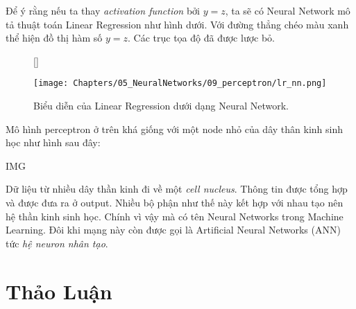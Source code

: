 Để ý rằng nếu ta thay \textit{activation function} bởi $y = z$, ta sẽ có Neural Network mô tả thuật toán Linear Regression như hình dưới. Với đường thẳng chéo màu xanh thể hiện đồ thị hàm số $y = z$. Các trục tọa độ đã được lược bỏ. 
 

\begin{figure}[t]
    [\FBwidth]
    {\caption{ 
    Biểu diễn của Linear Regression dưới dạng Neural Network.
    }
    \label{fig:9_6}}
    { %
    \texttt{[image: Chapters/05\_NeuralNetworks/09\_perceptron/lr\_nn.png]}
    }
\end{figure}

 
Mô hình perceptron ở trên khá giống với một node nhỏ của dây thân kinh sinh học như hình sau đây: 
 

    

{\color{red} IMG}

 
 
Dữ liệu từ nhiều dây thần kinh đi về một \textit{cell nucleus}. Thông tin được tổng hợp và được đưa ra ở output. Nhiều bộ phận như thế này kết hợp với nhau tạo nên hệ thần kinh sinh học. Chính vì vậy mà có tên Neural Networks trong Machine Learning. Đôi khi mạng này còn được gọi là Artificial Neural Networks (ANN) tức \textit{hệ neuron nhân tạo}.  
 
 
\section{Thảo Luận}
 
